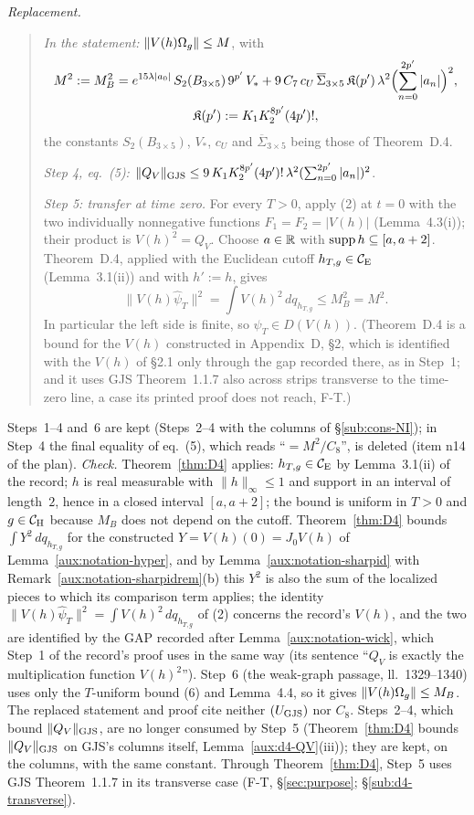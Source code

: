 \emph{Replacement.}
\begin{quote}\small
\emph{In the statement:} $\|V(h)\Omega_g\|\le M$, with
\begin{gather*}
 M^2:=M_B^2=e^{15\lambda|a_0|}\,S_2(B_{3\times5})\,9^{p'}\,V_*
 +9\,C_7\,c_U\,\overline\Sigma_{3\times5}\,\mathfrak K(p')\,\lambda^2\Bigl(\sum_{n=0}^{2p'}|a_n|\Bigr)^2,\\
 \mathfrak K(p'):=K_1K_2^{8p'}(4p')! ,
\end{gather*}
the constants $S_2(B_{3\times5})$, $V_*$, $c_U$ and $\overline\Sigma_{3\times5}$ being those of
Theorem~D.4.

\emph{Step 4, eq.~(5):} $\|Q_V\|_{\rm GJS}\le9\,K_1K_2^{8p'}(4p')!\,\lambda^2
(\sum_{n=0}^{2p'}|a_n|)^2$.

\emph{Step 5: transfer at time zero.}  For every $T>0$, apply (2) at $t=0$ with the two
individually nonnegative functions $F_1=F_2=|V(h)|$ (Lemma~4.3(i)); their product is
$V(h)^2=Q_V$.  Choose $a\in\mathbb{R}$ with $\operatorname{supp} h\subseteq[a,a+2]$.  Theorem~D.4, applied with the
Euclidean cutoff $h_{T,g}\in\mathcal{C}_{\mathrm E}$ (Lemma~3.1(ii)) and with $h':=h$, gives
\[
 \|V(h)\hat\psi_T\|^2=\int V(h)^2\,dq_{h_{T,g}}\le M_B^2=M^2 .
 \tag{6}
\]
In particular the left side is finite, so $\psi_T\in D(V(h))$.  (Theorem~D.4 is a bound for the
$V(h)$ constructed in Appendix~D, \S2, which is identified with the $V(h)$ of \S2.1 only through
the gap recorded there, as in Step~1; and it uses GJS Theorem~1.1.7 also across strips
transverse to the time-zero line, a case its printed proof does not reach, F-T.)
\end{quote}
Steps~1--4 and~6 are kept (Steps~2--4 with the columns of \S\ref{sub:cons-NI}); in Step~4 the
final equality of eq.~(5), which reads ``$=M^2/C_8$'', is deleted (item n14 of the plan).
\emph{Check.}  Theorem~\ref{thm:D4} applies: $h_{T,g}\in\mathcal{C}_{\mathrm E}$ by Lemma~3.1(ii) of the record; $h$
is real measurable with $\|h\|_\infty\le1$ and support in an interval of length~$2$, hence in a
closed interval $[a,a+2]$; the bound is uniform in $T>0$ and $g\in\mathcal{C}_{\mathrm H}$ because $M_B$ does not
depend on the cutoff.  Theorem~\ref{thm:D4} bounds $\int Y^2\,dq_{h_{T,g}}$ for the constructed
$Y=V(h)(0)=J_0V(h)$ of Lemma~\ref{aux:notation-hyper}, and by Lemma~\ref{aux:notation-sharpid}
with Remark~\ref{aux:notation-sharpidrem}(b) this $Y^2$ is also the sum of the localized pieces to
which its comparison term applies; the identity $\|V(h)\hat\psi_T\|^2=\int V(h)^2\,dq_{h_{T,g}}$
of (2) concerns the record's $V(h)$, and the two are identified by the GAP recorded after
Lemma~\ref{aux:notation-wick}, which Step~1 of the record's proof uses in the same way (its
sentence ``$Q_V$ is exactly the multiplication function $V(h)^2$'').  Step~6 (the weak-graph
passage, ll.~1329--1340) uses only the $T$-uniform bound (6) and Lemma~4.4, so it gives
$\|V(h)\Omega_g\|\le M_B$.  The replaced statement and proof cite neither $(U_{\rm GJS})$ nor $C_8$.
Steps~2--4, which bound $\lVert Q_V\rVert_{\mathrm{GJS}}$, are no longer consumed by Step~5 (Theorem~\ref{thm:D4}
bounds $\lVert Q_V\rVert_{\mathrm{GJS}}$ on GJS's columns itself, Lemma~\ref{aux:d4-QV}(iii)); they are kept, on the
columns, with the same constant.  Through Theorem~\ref{thm:D4}, Step~5 uses GJS Theorem~1.1.7 in
its transverse case (F-T, \S\ref{sec:purpose}; \S\ref{sub:d4-transverse}).

